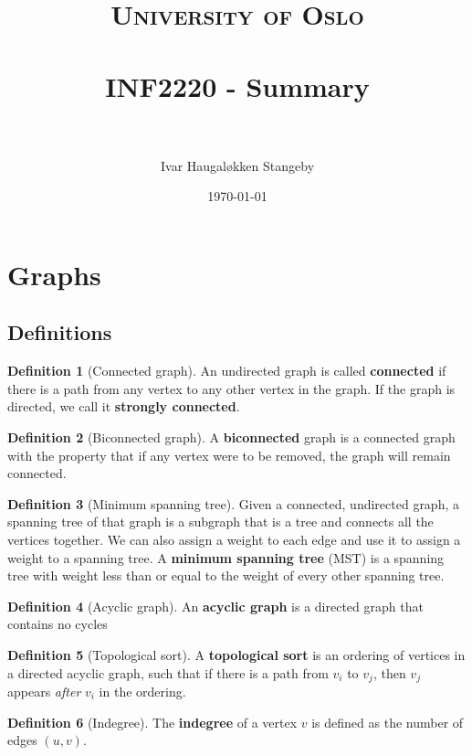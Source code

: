 \documentclass[paper=a4, fontsize=11pt]{scrartcl}
\title{ 
  \normalfont \normalsize
  \textsc{University of Oslo} \\ [25pt] %
  \horrule{0.5pt} \\[0.4cm] %
  \huge INF2220 - Summary \\ %
  \horrule{2pt} \\[0.5cm] %
}
\author{Ivar Haugaløkken Stangeby} %
\date{\normalsize\today} %
\numberwithin{equation}{section} %
\numberwithin{figure}{section} %
\numberwithin{table}{section} %
\theoremstyle{definition}
\newtheorem*{definition}{Definition}
\begin{document}
\maketitle %
\tableofcontents
\section{Graphs}

\subsection{Definitions}
\begin{definition}[Connected graph]
  An undirected graph is called \textbf{connected} if there is a path from any vertex to any other vertex in the graph. If the graph is directed, we call it \textbf{strongly connected}.
\end{definition}
\begin{definition}[Biconnected graph]
  A \textbf{biconnected} graph is a connected graph with the property that if any vertex were to be removed, the graph will remain connected.   
\end{definition}

\begin{definition}[Minimum spanning tree]
  Given a connected, undirected graph, a spanning tree of that graph is a subgraph that is a tree and connects all the vertices together. We can also assign a weight to each edge and use it to assign a weight to a spanning tree. A \textbf{minimum spanning tree} (MST) is a spanning tree with weight less than or equal to the weight of every other spanning tree.
\end{definition}

\begin{definition}[Acyclic graph]
  An \textbf{acyclic graph} is a directed graph that contains no cycles
\end{definition}

\begin{definition}[Topological sort] 
  A \textbf{topological sort} is an ordering of 
  vertices in a directed acyclic
  graph, such that if there is a path from \(v_i\) to \(v_j\),
  then \(v_j\) appears \textit{after} \(v_i\) in the ordering.  
\end{definition}

\begin{definition}[Indegree]
  The \textbf{indegree} of a vertex \(v\) is defined as the number of edges \(\left(u,v\right)\).
\end{definition}
\end{document}

